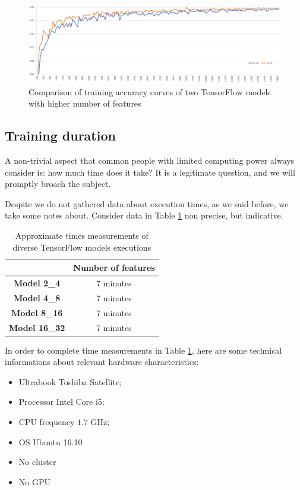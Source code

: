 \begin{landscape}
\begin{figure}
	\centering
	\caption{Comparison of training accuracy curves of two TensorFlow models with higher number of features}
	\label{fig:cfr_high}
	\includegraphics[width=1\textheight]{Images/cfr_8_16_vs_16_32}
\end{figure}
\end{landscape}

\subsection{Training duration}

A non-trivial aspect that common people with limited computing power always consider is: how much time does it take? It is a legitimate question, and we will promptly broach the subject.

Despite we do not gathered data about execution times, as we said before, we take some notes about. Consider data in Table \ref{tab:approx_times} non precise, but indicative.

\begin{table}
	\caption{Approximate times measurements of diverse TensorFlow models executions}
	\label{tab:approx_times}
	\centering
	\begin{tabular}{cc}
		\hline 
		& \textbf{Number of features} \\ 
		\hline 
		\textbf{Model 2\_4} & 7 minutes \\ 
		\textbf{Model 4\_8} & 7 minutes \\ 
		\textbf{Model 8\_16} & 7 minutes \\ 
		\textbf{Model 16\_32} & 7 minutes \\ 
		\hline 
	\end{tabular}
\end{table}

In order to complete time measurements in Table \ref{tab:approx_times}, here are some technical informations about relevant hardware characteristics:
\begin{itemize}
	\item Ultrabook Toshiba Satellite;
	\item Processor Intel Core i5;
	\item CPU frequency $1.7$ GHz;
	\item OS Ubuntu 16.10
	\item No cluster
	\item No GPU
\end{itemize}


